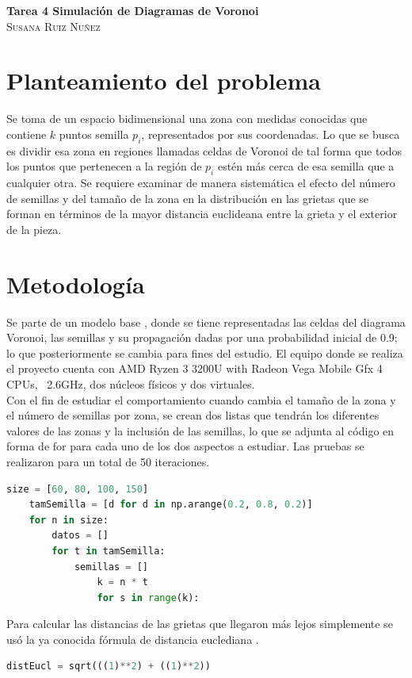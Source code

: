 \documentclass{article}
\begin{document}
	\begin{center}
	\huge{\textbf{Tarea 4 Simulación de Diagramas de Voronoi}}\\
	
	\textsc{ \Large Susana Ruiz Nuñez}
	\end{center}


\section{Planteamiento del problema} 
Se toma de un espacio bidimensional \cite{satu} una zona con medidas conocidas que contiene $k$ puntos semilla $p_i$, representados por sus coordenadas. Lo que se busca es dividir esa zona en regiones llamadas celdas de Voronoi de tal forma que todos los puntos que pertenecen a la región de $p_i$ estén más cerca de esa semilla que a cualquier otra. Se requiere examinar de manera sistemática el efecto del número de semillas y del tamaño de la zona en la distribución en las grietas que se forman en términos de la mayor distancia euclideana entre la grieta y el exterior de la pieza.


\section{Metodología}
Se parte de un modelo base \cite{satu}, donde se tiene representadas las celdas del diagrama Voronoi, las semillas y su propagación dadas por una probabilidad inicial de 0.9; lo que posteriormente se cambia para fines del estudio. El equipo donde se realiza el proyecto cuenta con AMD Ryzen 3 3200U with Radeon Vega Mobile Gfx 4 CPUs, ~2.6GHz, dos núcleos físicos y dos virtuales.\\
Con el fin de estudiar el comportamiento cuando cambia el tamaño de la zona y el número de semillas por zona, se crean dos listas que tendrán los diferentes valores de las zonas y la inclusión de las semillas, lo que se adjunta al código en forma de for para cada uno de los dos aspectos a estudiar. Las pruebas se realizaron para un total de 50 iteraciones.
  

\begin{lstlisting}[language=Python]
	size = [60, 80, 100, 150]
	tamSemilla = [d for d in np.arange(0.2, 0.8, 0.2)]
	for n in size:
		datos = []
		for t in tamSemilla:
			semillas = []
				k = n * t
				for s in range(k):
\end{lstlisting}

Para calcular las distancias de las grietas que llegaron más lejos simplemente se usó la ya conocida fórmula de distancia euclediana \cite{satu2}.
\begin{lstlisting}[language=Python]
	distEucl = sqrt(((1)**2) + ((1)**2))
\end{lstlisting}
\end{document}

